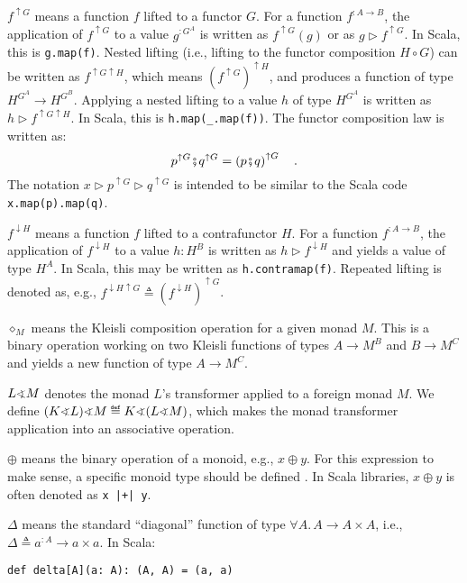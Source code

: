 $f^{\uparrow G}$ means a function $f$ lifted to a functor $G$.
For a function $f^{:A\rightarrow B}$, the application of $f^{\uparrow G}$
to a value $g^{:G^{A}}$ is written as $f^{\uparrow G}(g)$ or as
$g\triangleright f^{\uparrow G}$. In Scala, this is \lstinline!g.map(f)!.
Nested lifting (i.e., lifting to the functor composition $H\circ G$)
can be written as $f^{\uparrow G\uparrow H}$, which means $\left(f^{\uparrow G}\right)^{\uparrow H}$,
and produces a function of type $H^{G^{A}}\rightarrow H^{G^{B}}$.
Applying a nested lifting to a value $h$ of type $H^{G^{A}}$ is
written as $h\triangleright f^{\uparrow G\uparrow H}$. In Scala,
this is \lstinline!h.map(_.map(f))!. The functor composition law
is written as:
\[
p^{\uparrow G}\bef q^{\uparrow G}=\left(p\bef q\right)^{\uparrow G}\quad.
\]
The notation $x\triangleright p^{\uparrow G}\triangleright q^{\uparrow G}$
is intended to be similar to the Scala code \lstinline!x.map(p).map(q)!.

$f^{\downarrow H}$ means a function $f$ lifted to a contrafunctor
$H$. For a function $f^{:A\rightarrow B}$, the application of $f^{\downarrow H}$
to a value $h:H^{B}$ is written as $h\triangleright f^{\downarrow H}$
and yields a value of type $H^{A}$. In Scala, this may be written
as \lstinline!h.contramap(f)!. Repeated lifting is denoted as, e.g.,
$f^{\downarrow H\uparrow G}\triangleq(f^{\downarrow H})^{\uparrow G}$.

$\diamond_{M}$ means the Kleisli composition operation for a given
monad $M$. This is a binary operation working on two Kleisli functions
of types $A\rightarrow M^{B}$ and $B\rightarrow M^{C}$ and yields
a new function of type $A\rightarrow M^{C}$.

$L\varangle M$ denotes the monad $L$\textsf{'}s transformer applied to a
foreign monad $M$. We define $(K\varangle L)\varangle M\triangleq K\varangle(L\varangle M)$,
which makes the monad transformer application into an associative
operation.

$\oplus$ means the binary operation of a monoid, e.g., $x\oplus y$.
For this expression to make sense, a specific monoid type should be
defined . In Scala libraries, $x\oplus y$ is often denoted as \lstinline!x |+| y!.

$\Delta$ means the standard \textsf{``}diagonal\textsf{''} function of type $\forall A.\,A\rightarrow A\times A$,
i.e., $\Delta\triangleq a^{:A}\rightarrow a\times a$. In Scala:
\begin{lstlisting}
def delta[A](a: A): (A, A) = (a, a)
\end{lstlisting}

